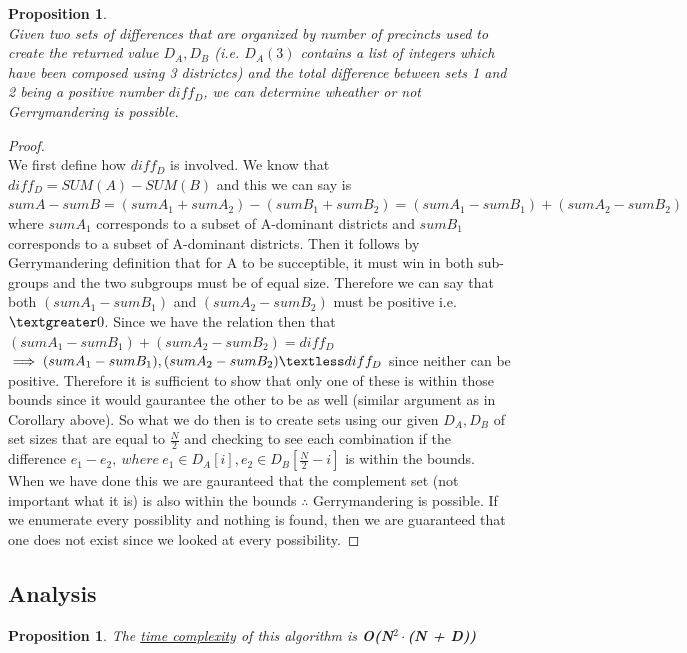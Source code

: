 \documentclass[12pt]{article}
\newtheorem{proposition}[theorem]{Proposition}
\begin{document}
\begin{proposition}
~ \\ \indent Given two sets of differences that are organized by number of precincts used to create the returned
value $D_A, D_B$ (i.e. $D_A(3)$ contains a list of integers which have been composed using 3 districtcs) and the
total difference between sets 1 and 2 being a positive number $diff_D$, we can determine wheather or not
Gerrymandering is possible.
\end{proposition}

\begin{proof}
~ \\ \indent We first define how $diff_D$ is involved. We know that $diff_D = SUM(A) - SUM(B)$ and this we can
say is $sumA - sumB = (sumA_1 + sumA_2) - (sumB_1 + sumB_2) = (sumA_1 - sumB_1) + (sumA_2 - sumB_2)$ where
$sumA_1$ corresponds to a subset of A-dominant districts and $sumB_1$ corresponds to a subset of A-dominant districts.
Then it follows by Gerrymandering definition that for A to be succeptible, it must win in both sub-groups and the
two subgroups must be of equal size. Therefore we can say that both $(sumA_1 - sumB_1)$ and $(sumA_2 - sumB_2)$
must be positive i.e. $\textgreater 0$.  Since we have the relation then that $(sumA_1 - sumB_1) + (sumA_2 - sumB_2) = diff_D$
$\implies (sumA_1 - sumB_1), (sumA_2 - sumB_2) \textless diff_D$ since neither can be positive.  Therefore it is sufficient
to show that only one of these is within those bounds since it would gaurantee the other to be as well (similar argument
as in Corollary above). So what we do then is to create sets using our given $D_A, D_B$ of set sizes that are equal
to $\frac{N}{2}$ and checking to see each combination if the difference
$e_1 - e_2,\ where\ e_1 \in D_A[i], e_2 \in D_B[\frac{N}{2}-i]$ is within the bounds.  When we have done this we
are gauranteed that the complement set (not important what it is) is also within the bounds $\therefore$
Gerrymandering is possible. If we enumerate every possiblity and nothing is found, then we are guaranteed that one
does not exist since we looked at every possibility.
\end{proof}

\subsection{Analysis}

\begin{proposition}
\label{numq}
The \underline{time complexity} of this algorithm is \textbf{O(N$^2\cdot$(N + D))}
\end{proposition}
\end{document}
